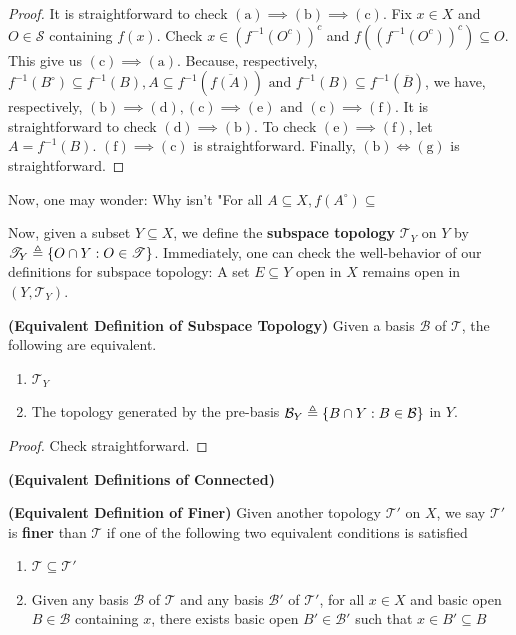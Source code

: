 \documentclass{report}
\begin{document}
\begin{proof}
It is straightforward to check  $(\text{a})\implies (\text{b})\implies (\text{c})$. Fix $x \in X$ and $O \in \mathscr{S }$ containing $f(x)$. Check $x \in (f^{-1}(O^c))^c$ and $f((f^{-1}(O^c))^c)\subseteq O$. This give us  $(\text{c})\implies (\text{a})$. Because, respectively, $f^{-1}(B^\circ )\subseteq f^{-1}(B),A\subseteq f^{-1}(\overline{f(A)})\text{ and }f^{-1}(B)\subseteq f^{-1}(\overline{B})$, we have, respectively,  $(\text{b})\implies (\text{d}),(\text{c})\implies (\text{e})\text{ and }(\text{c})\implies (\text{f})$. It is straightforward to check $(\text{d})\implies (\text{b})$. To check $(\text{e})\implies (\text{f})$, let $A=f^{-1}(B)$. $(\text{f})\implies (\text{c})$ is straightforward. Finally, $(\text{b})\iff (\text{g})$ is straightforward. 
\end{proof}
\begin{mdframed}
Now, one may wonder: Why isn't "For all $A\subseteq X,f(A^\circ )\subseteq $
\end{mdframed}
\begin{mdframed}
Now, given a subset $Y\subseteq X$, we define the \textbf{subspace topology} $\mathscr{T }_Y$ on $Y$ by $\mathscr{T}_Y\triangleq \{ O\cap Y:O\in \mathscr{T } \}$. Immediately, one can check the well-behavior of our definitions for subspace topology: A set $E\subseteq Y$ open in $X$ remains open in $(Y,\mathscr{T }_Y)$.
\end{mdframed}
\begin{theorem}
\textbf{(Equivalent Definition of Subspace Topology)} Given a basis $\mathcal{B}$ of $\mathscr{T }$, the following are equivalent.
\begin{enumerate}[label=(\alph*)]
  \item $\mathscr{T }_Y$
  \item The topology generated by the pre-basis $\mathcal{B}_Y\triangleq \{ B\cap Y:B \in \mathcal{B} \}$ in $Y$.
\end{enumerate}
\end{theorem}
\begin{proof}
Check straightforward.
\end{proof}
\begin{theorem}
\textbf{(Equivalent Definitions of Connected)}
\end{theorem}
\begin{theorem}
\textbf{(Equivalent Definition of Finer)} Given another topology $\mathscr{T}'$ on $X$, we say  $\mathscr{T}'$ is \textbf{finer} than $\mathscr{T}$ if one of the following two equivalent conditions is satisfied 
\begin{enumerate}[label=(\alph*)]
  \item $\mathscr{T}\subseteq \mathscr{T }'$ 
  \item Given any basis $\mathcal{B}$ of $\mathscr{T }$ and any basis $\mathcal{B}'$ of $\mathscr{T }'$, for all $x \in X$ and basic open $B \in \mathcal{B}$ containing $x$, there exists basic open  $B'\in \mathcal{B}'$ such that $x \in B' \subseteq B$ 
\end{enumerate}
\end{theorem}
\end{document}

